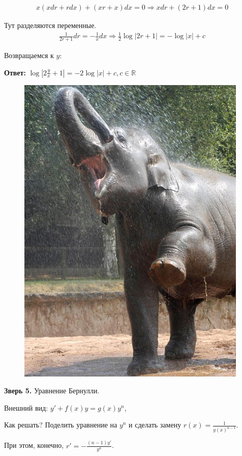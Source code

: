 \documentclass[10pt,a4paper]{article}
\begin{document}
\begin{eqnarray*}
x(xdr + rdx) + (xr + x) dx = 0 \Rightarrow xdr + (2r+1)dx = 0 
\end{eqnarray*}
\par Тут разделяются переменные.
\begin{eqnarray*}
\frac{1}{2r + 1} dr = -\frac{1}{x} dx \Rightarrow \frac{1}{2}\log|2r + 1| = -\log|x| + c
\end{eqnarray*}
\par Возвращаемся к $y$:
\par \textbf{Ответ:} $\log|2\frac yx + 1| = -2\log|x| + c, c \in \mathbb{R}$ \\
\newpage
\pagecolor{Salmon}
\begin{figure}[h]
\centering
\includegraphics[width = 11cm]{eleph.jpg}
\end{figure}
\par \textbf{Зверь 5.} Уравнение Бернулли.
\par Внешний вид: $y' + f(x) y = g(x) y^n$,  
\par Как решать? Поделить уравнение на $y^n$ и сделать замену $r(x) = \frac1 {y(x)^{n-1}}$. 
\par При этом, конечно, $r' = - \frac{(n-1)y'}{y^n}$.
\end{document}
